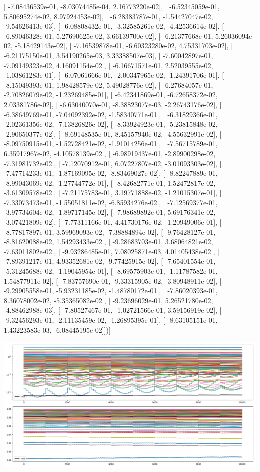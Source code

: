 \documentclass{article}
\begin{document}
       [ -7.08436539e-01,  -8.03074485e-04,   2.16773220e-02],
       [ -6.52345059e-01,   5.80695274e-02,   8.97924453e-02],
       [ -6.28383787e-01,  -1.54427047e-02,  -9.54626413e-03],
       [ -6.08808432e-01,  -3.32585261e-02,  -4.42536614e-02],
       [ -6.89046328e-01,   5.27690625e-02,   3.66139700e-02],
       [ -6.21377668e-01,   5.26036094e-02,  -5.18429143e-02],
       [ -7.16539878e-01,  -6.60323280e-02,   4.75331703e-02],
       [ -6.21175150e-01,   3.54190265e-03,   3.33388507e-03],
       [ -7.60042897e-01,  -7.09149323e-02,   4.16091154e-02],
       [ -6.16671571e-01,   2.52039555e-02,  -1.03861283e-01],
       [ -6.07061666e-01,  -2.00347965e-02,  -1.24391706e-01],
       [ -8.15049393e-01,   1.98428579e-02,   5.49028776e-02],
       [ -6.27684057e-01,  -2.70826079e-02,  -1.23269485e-01],
       [ -6.42341869e-01,  -6.72658372e-02,   2.03381786e-02],
       [ -6.63040070e-01,  -8.38823077e-03,  -2.26743176e-02],
       [ -6.38649769e-01,  -7.04092392e-02,  -1.58340771e-01],
       [ -6.31829366e-01,  -2.02361356e-02,  -7.13826826e-02],
       [ -8.33924923e-01,  -5.23815848e-02,  -2.90650377e-02],
       [ -8.69148535e-01,   8.45157940e-02,  -4.55632991e-02],
       [ -8.09750915e-01,  -1.52728421e-02,  -1.91014256e-01],
       [ -7.56715789e-01,   6.35917967e-02,  -4.10578139e-02],
       [ -6.98919437e-01,  -2.89900298e-02,  -7.31981732e-02],
       [ -7.12070912e-01,   6.07227807e-02,  -3.01093303e-02],
       [ -7.47714233e-01,  -1.87169095e-02,  -8.83469027e-02],
       [ -8.82247889e-01,  -8.99043069e-02,  -1.27744772e-01],
       [ -8.42682771e-01,   1.52472817e-02,  -3.61309578e-02],
       [ -7.21175783e-01,   3.19771888e-02,  -1.21015307e-01],
       [ -7.33073473e-01,  -1.55051811e-02,  -6.85934276e-02],
       [ -7.12569377e-01,  -3.97734604e-02,  -1.89717145e-02],
       [ -7.98689892e-01,   5.69176341e-02,  -3.07421809e-02],
       [ -7.77311166e-01,   4.41730176e-02,  -1.20949006e-01],
       [ -8.77817897e-01,   3.59969093e-02,  -7.38884894e-02],
       [ -9.76428127e-01,  -8.81620088e-02,   1.54293433e-02],
       [ -9.28683703e-01,   3.68064821e-02,  -7.63011802e-02],
       [ -9.93286485e-01,   7.08025871e-03,   4.01405438e-02],
       [ -7.89391217e-01,   4.93352681e-02,  -9.77425915e-02],
       [ -7.65401554e-01,  -5.31245688e-02,  -1.19045954e-01],
       [ -8.69575903e-01,  -1.11787582e-01,   1.54877911e-02],
       [ -7.83757690e-01,  -9.33315905e-02,  -3.80948911e-02],
       [ -9.29905558e-01,  -5.93231185e-02,  -1.48780172e-01],
       [ -7.86020393e-01,   8.36078002e-02,  -5.35365082e-02],
       [ -9.23696029e-01,   5.26521780e-02,  -4.88462988e-03],
       [ -7.80527467e-01,  -1.02721566e-01,   3.59156919e-02],
       [ -9.32456293e-01,  -2.11135459e-02,  -1.26895395e-01],
       [ -8.63105151e-01,   1.43223583e-03,  -6.08445195e-02]])]
\begin{center}
\includegraphics[scale=.9]{control_dpn_all.png}

\end{center}
\end{document}
